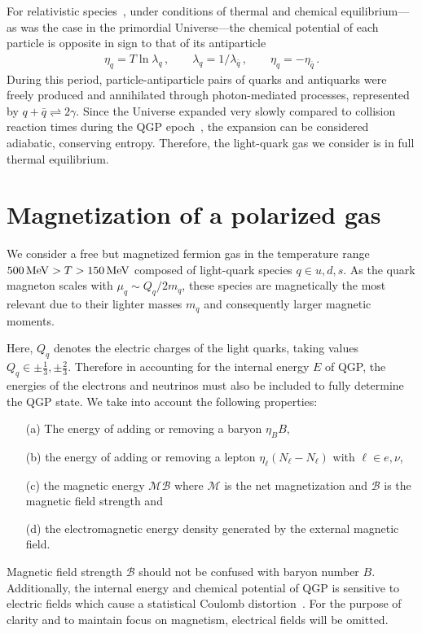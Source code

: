 \documentclass[epjST]{svjour}
\newcommand*{\MeV}{\text{\,MeV}}
\numberwithin{equation}{section}
\begin{document}
For relativistic species~\cite{Elze:1980er}, under conditions of thermal and chemical equilibrium---as was the case in the primordial Universe---the chemical potential of each particle is opposite in sign to that of its antiparticle
\begin{align}
    \eta_{q}=T\ln\lambda_{q}\,,\qquad
    \lambda_{q}=1/\lambda_{\bar{q}}\,,\qquad
    \eta_{q}=-\eta_{\bar{q}}\,.
\end{align}
During this period, particle-antiparticle pairs of quarks and antiquarks were freely produced and annihilated through photon-mediated processes, represented by $q+\bar{q}\rightleftharpoons2\gamma$. Since the Universe expanded very slowly compared to collision reaction times during the QGP epoch~\cite{Rafelski:2023emw,Yang:2024ret}, the expansion can be considered adiabatic, conserving entropy. Therefore, the light-quark gas we consider is in full thermal equilibrium.

\section{Magnetization of a polarized gas}
\label{sec:magnetization}
We consider a free but magnetized fermion gas in the temperature range $500\MeV>T>150\MeV$ composed of light-quark species $q \in {u,d,s}$. As the quark magneton scales with $\mu_{q} \sim Q_q/2m_q$, these species are magnetically the most relevant due to their lighter masses $m_q$ and consequently larger magnetic moments.

Here, $Q_q$ denotes the electric charges of the light quarks, taking values $Q_q \in {\pm \tfrac{1}{3}, \pm \tfrac{2}{3}}$. Therefore in accounting for the internal energy $E$ of QGP, the energies of the electrons and neutrinos must also be included to fully determine the QGP state. We take into account the following properties: 
\begin{itemize}
    \item[(a)] The energy of adding or removing a baryon $\eta_{B}B$,
    \item[(b)] the energy of adding or removing a lepton $\eta_{\ell}(N_{\ell}-N_{\ell})$ with $\ell\in {e,\nu}$, 
    \item[(c)] the magnetic energy $\mathcal{M}\mathcal{B}$ where $\mathcal{M}$ is the net magnetization and $\mathcal{B}$ is the magnetic field strength and
    \item[(d)] the electromagnetic energy density generated by the external magnetic field.
\end{itemize}
Magnetic field strength $\mathcal{B}$ should not be confused with baryon number $B$. Additionally, the internal energy and chemical potential of QGP is sensitive to electric fields which cause a statistical Coulomb distortion~\cite{Sigl:1996dm,Letessier:2002ony}. For the purpose of clarity and to maintain focus on magnetism, electrical fields will be omitted.
\end{document}
